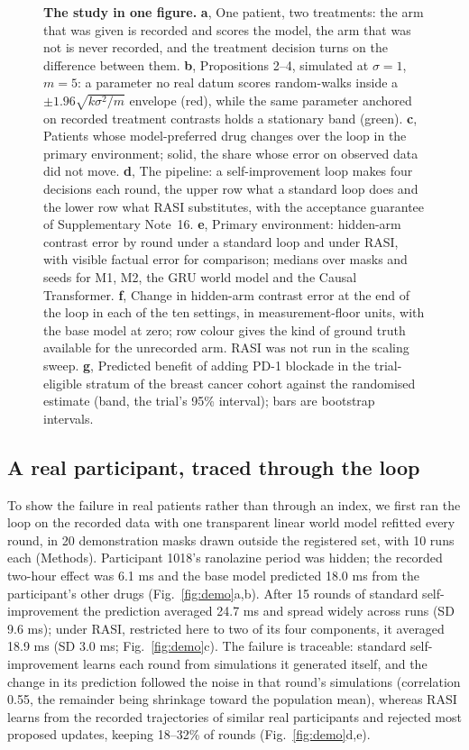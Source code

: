 \documentclass[11pt,a4paper]{article}
\begin{document}
\begin{figure}[!htbp]\centering
{}
\caption{\textbf{The study in one figure.} \textbf{a}, One patient, two treatments: the arm that was given is recorded and scores the model, the arm that was not is never recorded, and the treatment decision turns on the difference between them. \textbf{b}, Propositions 2--4, simulated at $\sigma=1$, $m=5$: a parameter no real datum scores random-walks inside a $\pm1.96\sqrt{k\sigma^2/m}$ envelope (red), while the same parameter anchored on recorded treatment contrasts holds a stationary band (green). \textbf{c}, Patients whose model-preferred drug changes over the loop in the primary environment; solid, the share whose error on observed data did not move. \textbf{d}, The pipeline: a self-improvement loop makes four decisions each round, the upper row what a standard loop does and the lower row what RASI substitutes, with the acceptance guarantee of Supplementary Note~16. \textbf{e}, Primary environment: hidden-arm contrast error by round under a standard loop and under RASI, with visible factual error for comparison; medians over masks and seeds for M1, M2, the GRU world model and the Causal Transformer. \textbf{f}, Change in hidden-arm contrast error at the end of the loop in each of the ten settings, in measurement-floor units, with the base model at zero; row colour gives the kind of ground truth available for the unrecorded arm. RASI was not run in the scaling sweep. \textbf{g}, Predicted benefit of adding PD-1 blockade in the trial-eligible stratum of the breast cancer cohort against the randomised estimate (band, the trial's 95\% interval); bars are bootstrap intervals.}\label{fig:loop}
\end{figure}
\FloatBarrier
\subsection{A real participant, traced through the loop}
To show the failure in real patients rather than through an index, we first ran the loop on the recorded data with one transparent linear world model refitted every round, in 20 demonstration masks drawn outside the registered set, with 10 runs each (Methods). Participant 1018's ranolazine period was hidden; the recorded two-hour effect was 6.1 ms and the base model predicted 18.0 ms from the participant's other drugs (Fig.~\ref{fig:demo}a,b). After 15 rounds of standard self-improvement the prediction averaged 24.7 ms and spread widely across runs (SD 9.6 ms); under RASI, restricted here to two of its four components, it averaged 18.9 ms (SD 3.0 ms; Fig.~\ref{fig:demo}c). The failure is traceable: standard self-improvement learns each round from simulations it generated itself, and the change in its prediction followed the noise in that round's simulations (correlation 0.55, the remainder being shrinkage toward the population mean), whereas RASI learns from the recorded trajectories of similar real participants and rejected most proposed updates, keeping 18--32\% of rounds (Fig.~\ref{fig:demo}d,e).
\end{document}

